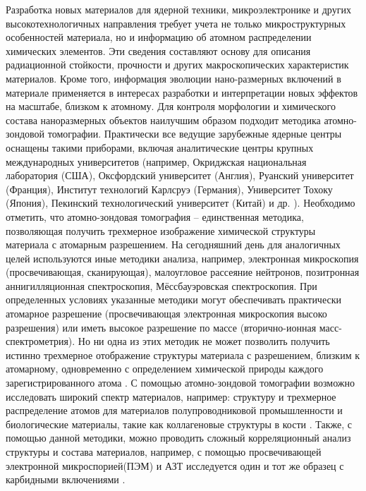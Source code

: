 
{\actuality} Разработка новых материалов для ядерной техники, микроэлектронике и других высокотехнологичных направления требует учета не только микроструктурных особенностей материала, но и информацию об атомном распределении химических элементов. Эти сведения составляют основу для описания радиационной стойкости, прочности и других макроскопических характеристик материалов. Кроме того, информация эволюции нано-размерных включений в материале применяется в интересах разработки и интерпретации новых эффектов на масштабе, близком к атомному.
Для контроля морфологии и химического состава наноразмерных объектов наилучшим образом подходит методика атомно-зондовой томографии. Практически все ведущие зарубежные ядерные центры оснащены такими приборами, включая аналитические центры крупных международных университетов (например, Окриджская национальная лаборатория (США), Оксфордский университет (Англия), Руанский университет (Франция), Институт технологий Карлсруэ (Германия), Университет Тохоку (Япония), Пекинский технологический университет (Китай) и др. \cite{APTlist}). Необходимо отметить, что атомно-зондовая томография – единственная методика, позволяющая получить трехмерное изображение химической структуры материала с атомарным разрешением. На сегодняшний день для аналогичных целей используются иные методики анализа, например, электронная микроскопия (просвечивающая, сканирующая), малоугловое рассеяние нейтронов, позитронная аннигилляционная спектроскопия, Мёссбауэровская спектроскопия. При определенных условиях указанные методики могут обеспечивать практически атомарное разрешение (просвечивающая электронная микроскопия высоко разрешения) или иметь высокое разрешение по массе (вторично-ионная масс-спектрометрия). Но ни одна из этих методик не может позволить получить истинно трехмерное отображение структуры материала с разрешением, близким к атомарному, одновременно с определением химической природы каждого зарегистрированного атома \cite{GaultBOOK}. С помощью атомно-зондовой томографии возможно исследовать широкий спектр материалов, например: структуру и трехмерное распределение атомов для материалов полупроводниковой промышленности \cite{Ulfig23} и биологические материалы, такие как коллагеновые структуры в кости \cite{Lee21}. Также, с помощью данной методики, можно проводить сложный корреляционный анализ структуры и состава материалов, например, с помощью просвечивающей электронной микроспорией(ПЭМ) и АЗТ исследуется один и тот же образец с карбидными включениями \cite{Liebscher18}.
